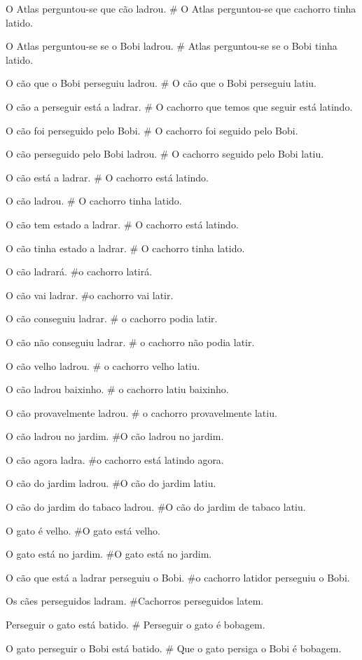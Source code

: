 O Atlas perguntou-se que cão ladrou.
# O Atlas perguntou-se que cachorro tinha latido.

O Atlas perguntou-se se o Bobi ladrou.
# Atlas perguntou-se se o Bobi tinha latido.

O cão que o Bobi perseguiu ladrou.
# O cão que o Bobi perseguiu latiu.

O cão a perseguir está a ladrar.
# O cachorro que temos que seguir está latindo.

O cão foi perseguido pelo Bobi.
# O cachorro foi seguido pelo Bobi.

O cão perseguido pelo Bobi ladrou.
# O cachorro seguido pelo Bobi latiu.

O cão está a ladrar.
# O cachorro está latindo.

O cão ladrou.
# O cachorro tinha latido.

O cão tem estado a ladrar.
# O cachorro está latindo.

O cão tinha estado a ladrar.
# O cachorro tinha latido.

O cão ladrará.
#o cachorro latirá.

O cão vai ladrar.
#o cachorro vai latir.

O cão conseguiu ladrar.
# o cachorro podia latir.

O cão não conseguiu ladrar.
# o cachorro não podia latir.

O cão velho ladrou.
# o cachorro velho latiu.

O cão ladrou baixinho.
# o cachorro latiu baixinho.

O cão provavelmente ladrou.
# o cachorro provavelmente latiu.

O cão ladrou no jardim.
#O cão ladrou no jardim.

O cão agora ladra.
#o cachorro está latindo agora.

O cão do jardim ladrou.
#O cão do jardim latiu.

O cão do jardim do tabaco ladrou.
#O cão do jardim de tabaco latiu.

O gato é  velho.
#O gato está velho.

O gato está no jardim.
#O gato está no jardim.

O cão que está a ladrar perseguiu o Bobi.
#o cachorro latidor perseguiu o Bobi.

Os cães perseguidos ladram.
#Cachorros perseguidos latem.

Perseguir o gato está batido.
# Perseguir o gato é  bobagem.

O gato perseguir o Bobi está batido.
# Que o gato persiga o Bobi é  bobagem.

